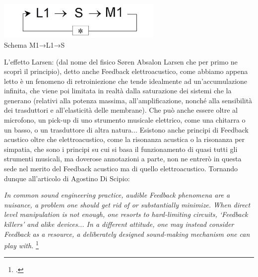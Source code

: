\begin{center}
\vspace{0.5cm}
\includegraphics[width=8cm]{figures/larsen_Feedback_scheme.png} \\
{Schema M1→L1→S} \\ 
\vspace{0.5cm}
\end{center}

L'effetto Larsen: (dal nome del fisico Søren Absalon Larsen
che per primo ne scoprì il principio), detto anche Feedback elettroacustico,
come abbiamo appena letto è un fenomeno di retroiniezione che tende idealmente 
ad un'accumulazione infinita, che viene poi limitata in realtà dalla saturazione dei sistemi 
che la generano (relativi alla potenza massima, all'amplificazione, nonché alla sensibilità dei
trasduttori e all'elasticità delle membrane). Che può anche essere oltre al microfono, un
pick-up di uno strumento musicale elettrico, come una chitarra o un basso, o un trasduttore di
altra natura... 
Esistono anche principi di Feedback acustico oltre che elettroacustico, 
come la risonanza acustica o la risonanza per simpatia,
che sono i principi su cui si basa il funzionamento di quasi tutti gli strumenti musicali,
ma doverose annotazioni a parte, non ne entrerò in questa sede nel merito del Feedback acustico
ma di quello elettroacustico.
Tornando dunque all'articolo di Agostino Di Scipio:

\begin{center}
\vspace{0.5cm}
\textit{In common sound engineering practice, audible Feedback phenomena are a nuisance, a problem one
should get rid of or substantially minimize. When direct level manipulation is not enough, one
resorts to hard-limiting circuits, ‘Feedback killers’ and alike devices... 
In a different attitude, one may instead consider Feedback as
a resource, a deliberately designed sound-making mechanism one can play with.} \footcite{di_scipio_relational_2022}
\vspace{0.5cm}
\end{center}

